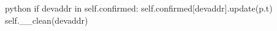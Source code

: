\begin{mintedbox}{python}
if devaddr in self.confirmed:
    self.confirmed[devaddr].update(p.t)
    self.__clean(devaddr)
\end{mintedbox}
